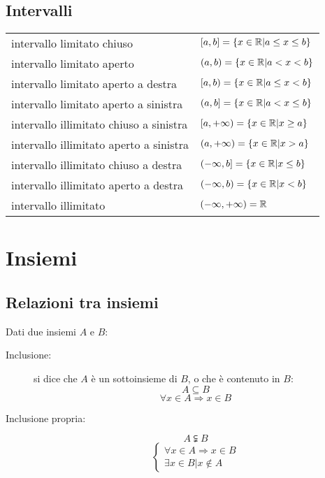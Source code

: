 \subsection{Intervalli}
\begin{tabular}{|l|l|}
\hline
intervallo limitato chiuso &$[a,b] = \left\{ x\in \mathbb{R} \middle| a \leq x \leq b \right\}$ \\
intervallo limitato aperto&$(a,b) = \left\{ x\in \mathbb{R} \middle| a < x < b \right\}$ \\
intervallo limitato aperto a destra&$[a,b) = \left\{ x\in \mathbb{R} \middle| a \leq x < b \right\}$ \\
intervallo limitato aperto a sinistra&$(a,b] = \left\{ x\in \mathbb{R} \middle| a < x \leq b \right\}$ \\
intervallo illimitato chiuso a sinistra&$[a,+\infty) = \left\{ x\in \mathbb{R} \middle| x \geq a \right\}$ \\
intervallo illimitato aperto a sinistra&$(a,+\infty) = \left\{ x\in \mathbb{R} \middle| x > a \right\}$ \\
intervallo illimitato chiuso a destra&$(-\infty,b] = \left\{ x\in \mathbb{R} \middle| x \leq b \right\}$ \\
intervallo illimitato aperto a destra&$(-\infty,b) = \left\{ x\in \mathbb{R} \middle| x < b \right\}$ \\
intervallo illimitato&$(-\infty,+\infty) = \mathbb{R}$ \\ \hline
\end{tabular}

\section{Insiemi}
\subsection{Relazioni tra insiemi}
Dati due insiemi $A$ e $B$:

\begin{description}
  \item[Inclusione:] si dice che $A$ è un sottoinsieme di $B$, o che è contenuto in $B$:
    \[A \subseteq  B\]
    \[\forall x \in A \Rightarrow x \in B\]
  \item[Inclusione propria:]
    \[A \subsetneqq  B\]
    \[
      \begin{cases}
        \forall x \in A \Rightarrow x \in B \\
        \exists x \in B | x \notin A
        \end{cases}
      \]
\end{description}

